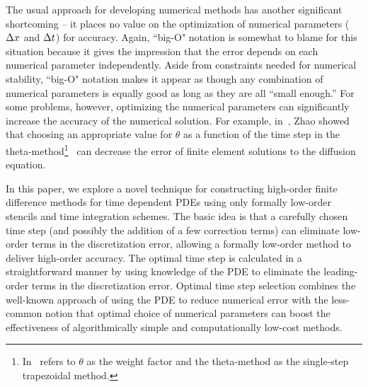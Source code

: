 \documentclass[oneeqnum,onefignum,onetabnum,onethmnum]{siamltex}
\begin{document}
The usual approach for developing numerical methods has another significant
shortcoming -- it places no value on the optimization of numerical parameters 
(\eg $\Delta x$ and $\Delta t$) for accuracy.  Again, ``big-O" notation is 
somewhat to blame for this situation because it gives the impression 
that the error depends on each numerical parameter independently.  Aside
from constraints needed for numerical stability, ``big-O" notation makes 
it appear as though any combination of numerical parameters is equally good 
as long as they are all ``small enough.''  For some problems, however, 
optimizing the numerical parameters can significantly increase the accuracy
of the numerical solution.  For example, in~\cite{zhao_2006}, Zhao showed 
that choosing an appropriate value for $\theta$ as a function of the time 
step in the theta-method\footnote{In~\cite{zhao_2006} refers to $\theta$ as 
the weight factor and the theta-method as the single-step trapezoidal 
method.}~\cite{iserles_book, gko_book} can decrease the error of finite 
element solutions to the diffusion equation. 

In this paper, we explore a novel technique for constructing high-order 
finite difference methods for time dependent PDEs using only formally 
low-order stencils and time integration schemes.  The basic idea is that a 
carefully chosen time step (and possibly the addition of a few correction 
terms) can eliminate low-order terms in the discretization error, allowing a 
formally low-order method to deliver high-order accuracy.  The optimal time 
step is calculated in a straightforward manner by using knowledge of the 
PDE to eliminate the leading-order terms in the discretization error.  
Optimal time step selection combines the well-known approach of using 
the PDE to reduce numerical error with the less-common notion that optimal 
choice of numerical parameters can boost the effectiveness of algorithmically 
simple and computationally low-cost methods.  
\end{document}

